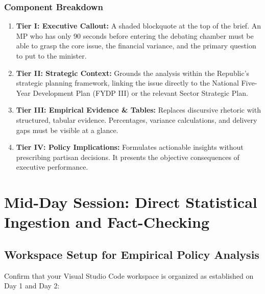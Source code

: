 \documentclass[11pt, a4paper]{report}
\begin{document}
\subsection{Component Breakdown}
\begin{enumerate}[label=\textbf{\arabic*.}]
    \item \textbf{Tier I: Executive Callout:} A shaded blockquote at the top of the brief. An MP who has only 90 seconds before entering the debating chamber must be able to grasp the core issue, the financial variance, and the primary question to put to the minister.
    \item \textbf{Tier II: Strategic Context:} Grounds the analysis within the Republic's strategic planning framework, linking the issue directly to the National Five-Year Development Plan (FYDP III) or the relevant Sector Strategic Plan.
    \item \textbf{Tier III: Empirical Evidence \& Tables:} Replaces discursive rhetoric with structured, tabular evidence. Percentages, variance calculations, and delivery gaps must be visible at a glance.
    \item \textbf{Tier IV: Policy Implications:} Formulates actionable insights without prescribing partisan decisions. It presents the objective consequences of executive performance.
\end{enumerate}

\vspace{1.5em}
\noindent{}
\vspace{1.5em}

\newpage

\chapter{Mid-Day Session: Direct Statistical Ingestion and Fact-Checking}

\section{Workspace Setup for Empirical Policy Analysis}
Confirm that your Visual Studio Code workspace is organized as established on Day 1 and Day 2:
\end{document}
